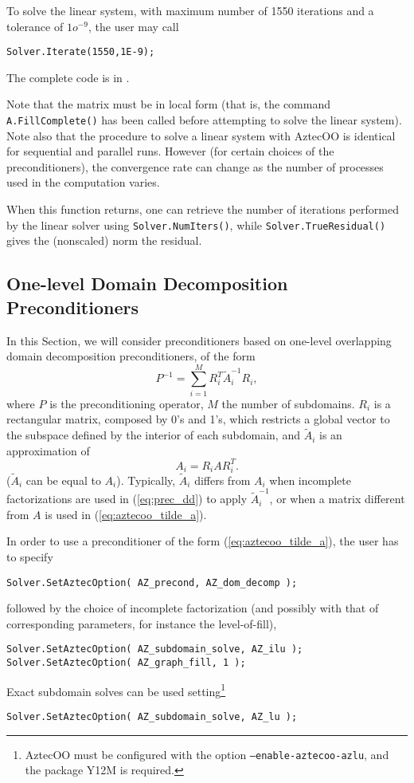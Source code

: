 To solve the linear system, with maximum number of 1550 iterations and a
tolerance of $1o^{-9}$, the user may call
\begin{verbatim}
Solver.Iterate(1550,1E-9);
\end{verbatim}
The complete code is in .

Note that the matrix must be in local form (that is, the command
\verb!A.FillComplete()! has been called before attempting to solve the
linear system).  Note also that the procedure to solve a linear system
with AztecOO is identical for sequential and parallel runs.  However
(for certain choices of the preconditioners), the convergence rate can
change as the number of processes used in the computation varies.

When this function returns, one can retrieve the number of iterations
performed by the linear solver using \verb!Solver.NumIters()!, while
\verb!Solver.TrueResidual()! gives the (nonscaled) norm the residual.



\subsection{One-level Domain Decomposition Preconditioners}
\label{sec:aztecoo_dd}

In this Section, we will consider preconditioners based on one-level
overlapping domain decomposition preconditioners, of the form
\begin{equation}
  \label{eq:prec_dd}
  P^{-1} = \sum_{i=1}^M R_i^T \tilde{A}_i^{-1} R_i,
\end{equation}
where $P$ is the preconditioning operator, $M$ the number of subdomains.
$R_i$ is a rectangular matrix, composed by 0's and 1's, which restricts
a global vector to the subspace defined by the interior of each
subdomain, and $\tilde{A}_i$ is an approximation of
\begin{equation}
  \label{eq:aztecoo_tilde_a}
  A_i = R_i A R_i^T .
\end{equation}
($\tilde{A}_i$ can be equal to $A_i$). Typically, $\tilde{A}_i$ differs
from $A_i$ when incomplete factorizations are used in (\ref{eq:prec_dd})
to apply $\tilde{A}_i^{-1}$, or when a matrix different from $A$ is used
in (\ref{eq:aztecoo_tilde_a}).

In order to use a preconditioner of the form (\ref{eq:aztecoo_tilde_a}),
the user has to specify
\begin{verbatim}
Solver.SetAztecOption( AZ_precond, AZ_dom_decomp );
\end{verbatim}
followed by the choice of incomplete factorization (and possibly with
that of corresponding parameters, for instance the level-of-fill),
\begin{verbatim}
Solver.SetAztecOption( AZ_subdomain_solve, AZ_ilu );
Solver.SetAztecOption( AZ_graph_fill, 1 );
\end{verbatim}
Exact subdomain solves can be used setting\footnote{AztecOO must be
  configured with the option {\tt --enable-aztecoo-azlu}, and the
  package Y12M is required.}
\begin{verbatim}
Solver.SetAztecOption( AZ_subdomain_solve, AZ_lu );
\end{verbatim}

